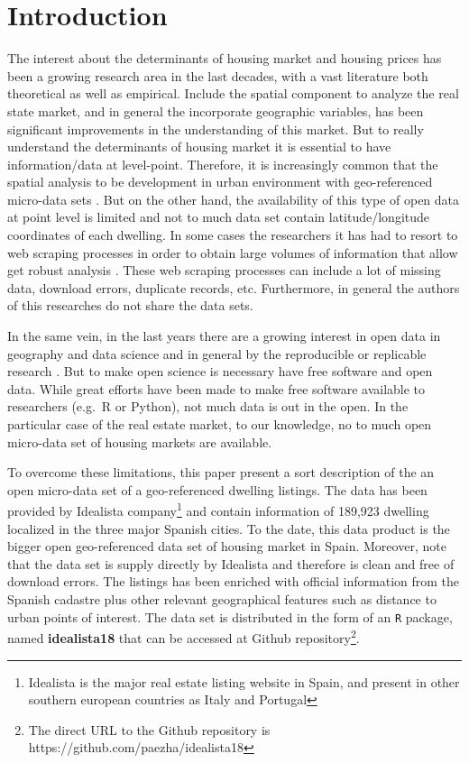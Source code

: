 \documentclass[Royal,times,sageh]{sagej}
\begin{document}
\hypertarget{introduction}{%
\section{Introduction}\label{introduction}}

The interest about the determinants of housing market and housing prices
has been a growing research area in the last decades, with a vast
literature both theoretical as well as empirical. Include the spatial
component to analyze the real state market, and in general the
incorporate geographic variables, has been significant improvements in
the understanding of this market. But to really understand the
determinants of housing market it is essential to have information/data
at level-point. Therefore, it is increasingly common that the spatial
analysis to be development in urban environment with geo-referenced
micro-data sets \citep[e.g.][]{lopez2015, crespo2013local}. But on the
other hand, the availability of this type of open data at point level is
limited and not to much data set contain latitude/longitude coordinates
of each dwelling. In some cases the researchers it has had to resort to
web scraping processes in order to obtain large volumes of information
that allow get robust analysis
\citep{gupta2022take, arbia2020spatial, Li2019, lopez2015}. These web
scraping processes can include a lot of missing data, download errors,
duplicate records, etc. Furthermore, in general the authors of this
researches do not share the data sets.

In the same vein, in the last years there are a growing interest in open
data in geography and data science
\citep{arribasl2021editorial, arribas2021} and in general by the
reproducible or replicable research \citep{paez2021open}. But to make
open science is necessary have free software and open data. While great
efforts have been made to make free software available to researchers
(e.g.~R or Python), not much data is out in the open. In the particular
case of the real estate market, to our knowledge, no to much open
micro-data set of housing markets are available.

To overcome these limitations, this paper present a sort description of
the an open micro-data set of a geo-referenced dwelling listings. The
data has been provided by Idealista
company\footnote{Idealista is the major real estate listing website in Spain, and present in other southern european countries as Italy and Portugal}
and contain information of 189,923 dwelling localized in the three major
Spanish cities. To the date, this data product is the bigger open
geo-referenced data set of housing market in Spain. Moreover, note that
the data set is supply directly by Idealista and therefore is clean and
free of download errors. The listings has been enriched with official
information from the Spanish cadastre plus other relevant geographical
features such as distance to urban points of interest. The data set is
distributed in the form of an \texttt{R} package, named
\textbf{idealista18} that can be accessed at Github
repository\footnote{The direct URL to the Github repository is https://github.com/paezha/idealista18}.
\end{document}
